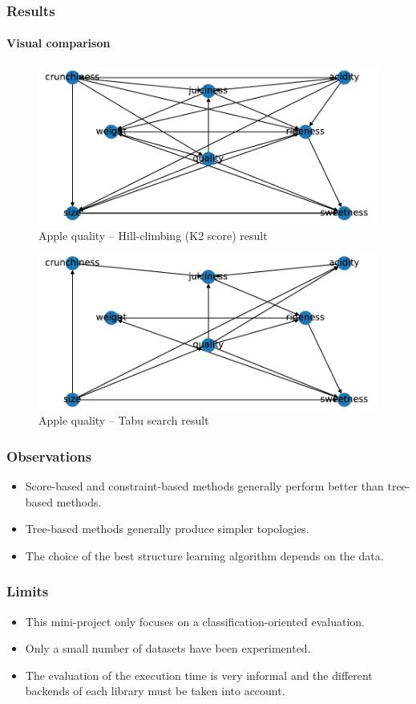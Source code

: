 \documentclass{beamer}
\begin{document}
\begin{frame}
    \frametitle{Results}
    \framesubtitle{Visual comparison}

    \begin{figure}
        \includegraphics[width=0.6\linewidth]{./img/apple_hc.pdf}
        \caption{Apple quality -- Hill-climbing (K2 score) result}
    \end{figure}
    \begin{figure}
        \includegraphics[width=0.6\linewidth]{./img/apple_ts.pdf}
        \caption{Apple quality -- Tabu search result}
    \end{figure}
\end{frame}


\begin{frame}
    \frametitle{Observations}

    \begin{itemize}
        \item Score-based and constraint-based methods generally perform better than tree-based methods.
        \item Tree-based methods generally produce simpler topologies.
        \item The choice of the best structure learning algorithm depends on the data.
    \end{itemize}
\end{frame}


\begin{frame}
    \frametitle{Limits}

    \begin{itemize}
        \item This mini-project only focuses on a classification-oriented evaluation.
        \item Only a small number of datasets have been experimented.
        \item The evaluation of the execution time is very informal and the different backends of each library must be taken into account.
    \end{itemize}
\end{frame}
\end{document}
